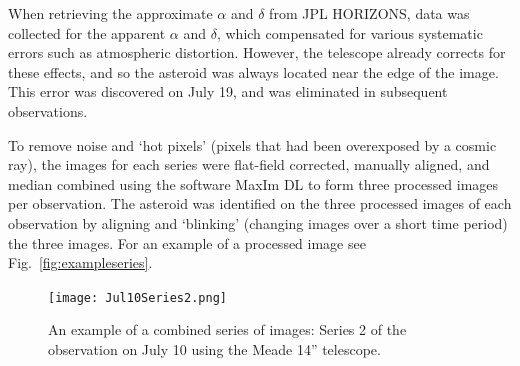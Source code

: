 \documentclass[12pt,journal,compsoc]{IEEEtran}
\begin{document}
When retrieving the approximate $\alpha$ and $\delta$ from JPL HORIZONS, 
data was collected for the apparent $\alpha$ and $\delta$,
which compensated for various systematic errors such as atmospheric distortion.
However, the telescope already corrects for these effects, 
and so the asteroid was always located near the edge of the image. 
This error was discovered on July 19, and was eliminated in subsequent observations.

To remove noise and `hot pixels' (pixels that had been overexposed by a cosmic ray), 
the images for each series were flat-field corrected, manually aligned, and median combined 
using the software MaxIm DL to form three processed images per observation.
The asteroid was identified on the three processed images of each observation 
by aligning and `blinking' (changing images over a short time period) the three images.
For an example of a processed image see Fig.~\ref{fig:exampleseries}.

\begin{figure}[!t]
\centering
\texttt{[image: Jul10Series2.png]}
\caption{An example of a combined series of images: Series 2 of the observation on July 10 using the Meade 14'' telescope.\label{fig:exampleseries}}
\label{fig_sim}
\end{figure}
\end{document}
